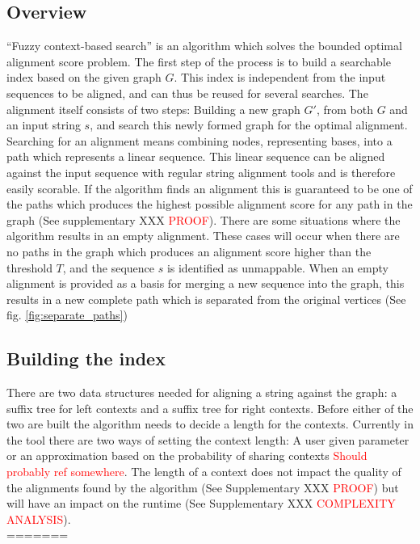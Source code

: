 \documentclass{article}
\begin{document}
\subsection{Overview}
``Fuzzy context-based search'' is an algorithm which solves the bounded optimal alignment score problem. The first step of the process is to build a searchable index based on the given graph $G$. This index is independent from the input sequences to be aligned, and can thus be reused for several searches. The alignment itself consists of two steps: Building a new graph $G'$, from both $G$ and an input string $s$, and search this newly formed graph for the optimal alignment. Searching for an alignment means combining nodes, representing bases, into a path which represents a linear sequence. This linear sequence can be aligned against the input sequence with regular string alignment tools and is therefore easily scorable. If the algorithm finds an alignment this is guaranteed to be one of the paths which produces the highest possible alignment score for any path in the graph (See supplementary XXX \textcolor{red}{PROOF}). There are some situations where the algorithm results in an empty alignment. These cases will occur when there are no paths in the graph which produces an alignment score higher than the threshold $T$, and the sequence $s$ is identified as unmappable. When an empty alignment is provided as a basis for merging a new sequence into the graph, this results in a new complete path which is separated from the original vertices (See fig. \ref{fig:separate_paths})
\subsection{Building the index}
There are two data structures needed for aligning a string against the graph: a suffix tree for left contexts and a suffix tree for right contexts. Before either of the two are built the algorithm needs to decide a length for the contexts. Currently in the tool there are two ways of setting the context length: A user given parameter or an approximation based on the probability of sharing contexts \textcolor{red}{Should probably ref somewhere}. The length of a context does not impact the quality of the alignments found by the algorithm (See Supplementary XXX \textcolor{red}{PROOF}) but will have an impact on the runtime (See Supplementary XXX \textcolor{red}{COMPLEXITY ANALYSIS}).\\
=======
\end{document}
